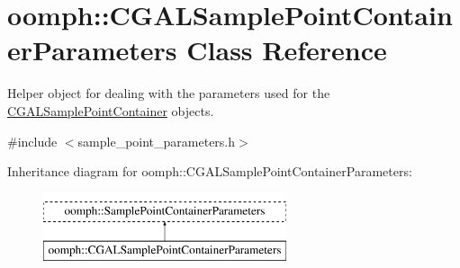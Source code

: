 \hypertarget{classoomph_1_1CGALSamplePointContainerParameters}{}\section{oomph\+:\+:C\+G\+A\+L\+Sample\+Point\+Container\+Parameters Class Reference}
\label{classoomph_1_1CGALSamplePointContainerParameters}


Helper object for dealing with the parameters used for the \hyperlink{classCGALSamplePointContainer}{C\+G\+A\+L\+Sample\+Point\+Container} objects.  




{\ttfamily \#include $<$sample\+\_\+point\+\_\+parameters.\+h$>$}

Inheritance diagram for oomph\+:\+:C\+G\+A\+L\+Sample\+Point\+Container\+Parameters\+:\begin{figure}[H]
\begin{center}
\leavevmode
\includegraphics[height=2.000000cm]{classoomph_1_1CGALSamplePointContainerParameters}
\end{center}
\end{figure}
